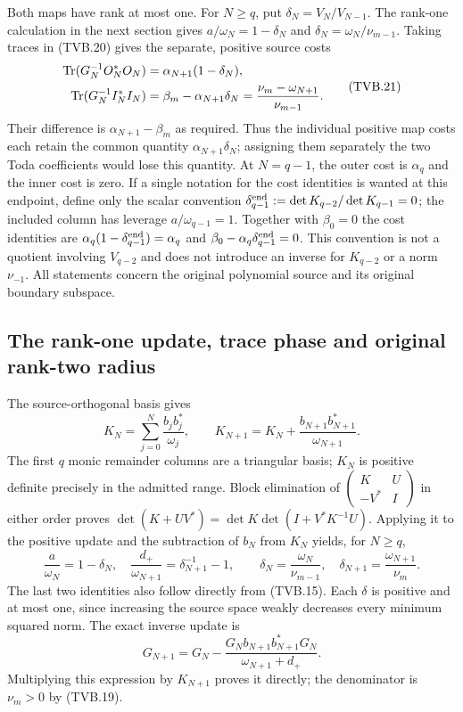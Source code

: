Both maps have rank at most one. For $N\ge q$, put
$\delta_N=V_N/V_{N-1}$. The rank-one calculation in the next
section gives $a/\omega_N=1-\delta_N$ and
$\delta_N=\omega_N/\nu_{m-1}$. Taking traces in (TVB.20) gives
the separate, positive source costs
\[
 \begin{split}
 \operatorname{Tr}(G_N^{-1}O_N^*O_N)&=\alpha_{N+1}(1-\delta_N),\\
 \operatorname{Tr}(G_N^{-1}I_N^*I_N)&=\beta_m-\alpha_{N+1}\delta_N
                   =\frac{\nu_m-\omega_{N+1}}{\nu_{m-1}}.
 \end{split}
 \tag{TVB.21}
\]
Their difference is $\alpha_{N+1}-\beta_m$ as required.
Thus the individual positive map costs each retain the common
quantity $\alpha_{N+1}\delta_N$; assigning them separately
the two Toda coefficients would lose this quantity.
At $N=q-1$, the outer cost is $\alpha_q$ and the inner cost is
zero. If a single notation for the cost identities is wanted at
this endpoint, define only the scalar convention
$\delta_{q-1}^{\rm end}:=\det K_{q-2}/\det K_{q-1}=0$;
the included column has leverage $a/\omega_{q-1}=1$.
Together with $\beta_0=0$ the cost identities are
$\alpha_q(1-\delta_{q-1}^{\rm end})=\alpha_q$ and
$\beta_0-\alpha_q\delta_{q-1}^{\rm end}=0$.
This convention is not a quotient involving $V_{q-2}$ and does
not introduce an inverse for $K_{q-2}$ or a norm $\nu_{-1}$.
All statements concern the original polynomial source and its
original boundary subspace.

\subsection{The rank-one update, trace phase and original rank-two radius}

The source-orthogonal basis gives
\[
 K_N=\sum_{j=0}^N\frac{b_jb_j^*}{\omega_j},\qquad
 K_{N+1}=K_N+\frac{b_{N+1}b_{N+1}^*}{\omega_{N+1}}.
 \tag{TVB.22}
\]
The first $q$ monic remainder columns are a triangular basis;
$K_N$ is positive definite precisely in the admitted range.
Block elimination of
$\left(\begin{smallmatrix}K&U\\-V^*&I\end{smallmatrix}\right)$
in either order proves
$\det(K+UV^*)=\det K\det(I+V^*K^{-1}U)$.
Applying it to the positive update and the subtraction of $b_N$
from $K_N$ yields, for $N\ge q$,
\[
 \frac a{\omega_N}=1-\delta_N,\quad
 \frac{d_+}{\omega_{N+1}}=\delta_{N+1}^{-1}-1,\qquad
 \delta_N=\frac{\omega_N}{\nu_{m-1}},\quad
 \delta_{N+1}=\frac{\omega_{N+1}}{\nu_m}.
 \tag{TVB.23}
\]
The last two identities also follow directly from (TVB.15).
Each $\delta$ is positive and at most one, since increasing the
source space weakly decreases every minimum squared norm.
The exact inverse update is
\[
 G_{N+1}=G_N-
 \frac{G_Nb_{N+1}b_{N+1}^*G_N}{\omega_{N+1}+d_+}.
 \tag{TVB.24}
\]
Multiplying this expression by $K_{N+1}$ proves it directly;
the denominator is $\nu_m>0$ by (TVB.19).

